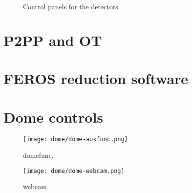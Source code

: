 \documentclass[11pt,fleqn,a4paper]{book}
\begin{document}
\begin{figure}[!ht]
\centering
{}\hfill
{}
\caption{Control panels for the detectors.}
\label{fig:gronddet}
\end{figure}



\section{P2PP and OT}

\section{FEROS reduction software}

\section{Dome controls}
\begin{figure}[!ht]
\centering
\texttt{[image: dome/dome-auxfunc.png]}
\caption[Dome auxiliary functions]{\gls{domefunc}.}
\label{fig:domefunc}
\end{figure}

\begin{figure}[!ht]
\centering
  \texttt{[image: dome/dome-webcam.png]}%
\caption[Dome webcam]{\gls{webcam}}
\label{fig:webcam}
\end{figure}
\end{document}
